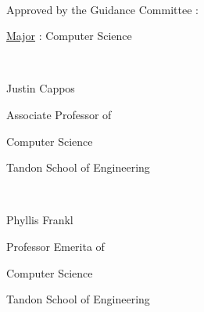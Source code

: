 \thispagestyle{plain}
\mbox{} \\
{\large
Approved by the Guidance Committee :

\vspace{.2 in}

\hspace{.2 in} \underline{Major} : Computer Science

\vspace{.2 in plus 1fill}

\hspace{3.2 in} \hrulefill\

\vspace{-.2 in}

\hspace{3.2 in} Justin Cappos
\vspace{-.1 in}

\hspace{3.2 in} Associate Professor of

\vspace{-.2 in}

\hspace{3.2 in} Computer Science

\vspace{-.2 in}
\hspace{3.2 in} Tandon School of Engineering

\vspace{.2 in plus 1fill}




\hspace{3.2 in} \hrulefill\

\vspace{-.2 in}

\hspace{3.2 in} Phyllis Frankl
\vspace{-.1 in}

\hspace{3.2 in} Professor Emerita of

\vspace{-.2 in}

\hspace{3.2 in} Computer Science

\vspace{-.2 in}
\hspace{3.2 in} Tandon School of Engineering

\vspace{.2 in plus 1fill}

}
